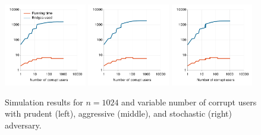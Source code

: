\documentclass{sig-alternate-05-2015}
\begin{document}
\begin{figure}[t]
	\hspace{-0.4em}
	\includegraphics[width=0.32\textwidth]{images/plot-prudent-VarT-1024}	
	\hspace{0.3em}
	\includegraphics[width=0.32\textwidth]{images/plot-aggressive-VarT-1024}	
	\hspace{0.3em}
	\includegraphics[width=0.32\textwidth]{images/plot-stochastic-VarT-1024}
	\caption{Simulation results for ${n=1024}$ and variable number of corrupt users with prudent (left), aggressive (middle), and stochastic (right) adversary.}
	\label{fig:plot2} 
\end{figure}

\end{document}

